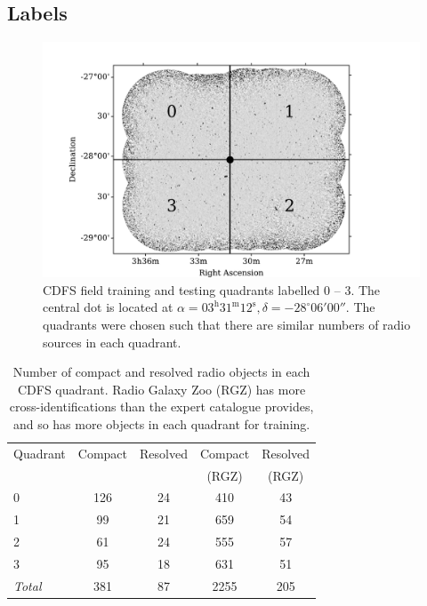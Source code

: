 \documentclass[fleqn,usenatbib,usedcolumn]{mnras}
\begin{document}
  \subsection{Labels}\label{sec:labels}
    \begin{figure}
      \centering
      \includegraphics[width=\columnwidth]{images/quadrants.pdf}
      \caption{CDFS field training and testing quadrants labelled 0 -- 3. The
        central dot is located at $\alpha = 03^\text{h}31^\text{m}12^\text{s},
        \delta = -28^\circ{}06'00''$. The quadrants were chosen such that
        there are similar numbers of radio sources in each
        quadrant.\label{fig:quadrants}}
    \end{figure}

    \begin{table}
      \caption{Number of compact and resolved radio objects in each CDFS quadrant. Radio Galaxy Zoo (RGZ) has more cross-identifications than the expert catalogue provides, and so has more objects in each quadrant for training.}
      \label{tab:radio-count}
      \begin{tabular}{lcccc}
        \hline
        Quadrant & Compact & Resolved & Compact & Resolved\\
        &&&(RGZ)&(RGZ)\\
        \hline
        0 & 126 & 24 & 410 & 43 \\
        1 & 99 & 21 & 659 & 54 \\
        2 & 61 & 24 & 555 & 57 \\
        3 & 95 & 18 & 631 & 51 \\
        \hline
        \textit{Total} & 381 & 87 & 2255 & 205\\
        \hline
      \end{tabular}
    \end{table}
\end{document}
